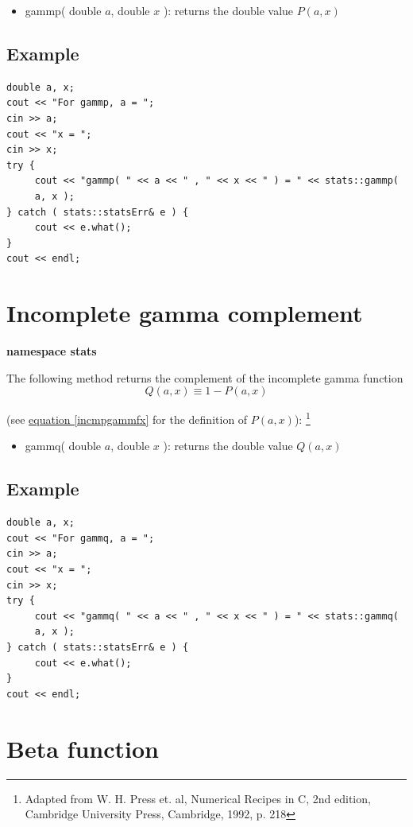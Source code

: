 \documentclass{report}
\begin{document}
\begin{itemize}
\item gammp( double $a$, double $x$ ): returns the double value
$P(a,x)$
\end{itemize}

\subsection{Example}
\begin{verbatim}
double a, x;
cout << "For gammp, a = ";
cin >> a;
cout << "x = ";
cin >> x;
try {
     cout << "gammp( " << a << " , " << x << " ) = " << stats::gammp(
     a, x );
} catch ( stats::statsErr& e ) {
     cout << e.what();
}
cout << endl;
\end{verbatim}

\section{Incomplete gamma complement}

{\bf namespace stats}

The following method returns the complement of the incomplete gamma
function
\begin{equation}\label{gammQlbl}
Q(a,x) \equiv 1-P(a,x)
\end{equation}

(see \hyperref[incmpgammfx]{equation \ref{incmpgammfx}} for the
definition of $P(a,x)$): \footnote{Adapted from W. H. Press et. al,
Numerical Recipes in C, 2nd edition, Cambridge University Press,
Cambridge, 1992, p. 218} 

\begin{itemize}
\item gammq( double $a$, double $x$ ): returns the double value
$Q(a,x)$
\end{itemize}

\subsection{Example}
\begin{verbatim}
double a, x;
cout << "For gammq, a = ";
cin >> a;
cout << "x = ";
cin >> x;
try {
     cout << "gammq( " << a << " , " << x << " ) = " << stats::gammq(
     a, x );
} catch ( stats::statsErr& e ) {
     cout << e.what();
}
cout << endl;
\end{verbatim}

\section{Beta function}
\end{document}
